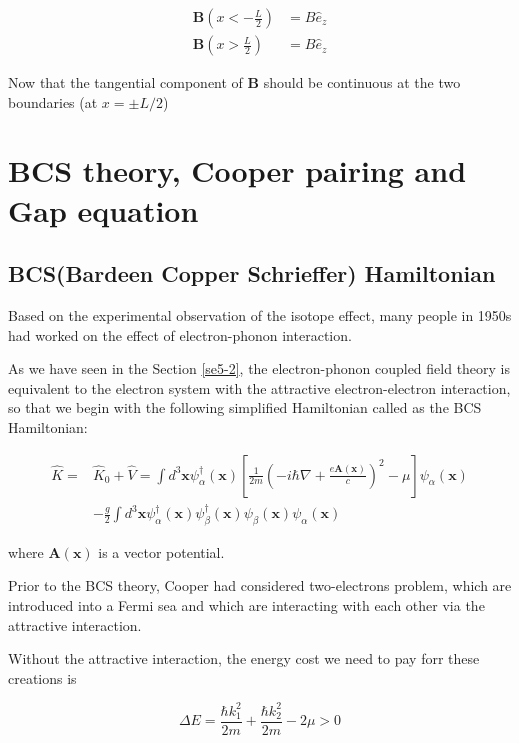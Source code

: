 ﻿\documentclass[twoside]{book}
\numberwithin{equation}{section}
\begin{document}
\[\begin{split}
\bm B\left(x < -\frac{L}{2}\right) &= B\hat{e}_z\\
\bm B\left(x > \frac{L}{2}\right) &= B\hat{e}_z
\end{split} \]

Now that the tangential component of $\bm{B}$ should be continuous at the two boundaries (at $x = \pm L/2$)







\section{BCS theory, Cooper pairing and Gap equation}

\subsection{BCS(Bardeen Copper Schrieffer) Hamiltonian}



Based on the experimental observation of the isotope effect, many people in 1950s had worked on the effect of electron-phonon interaction. 

As we have seen in the Section {\ref{se5-2}}, the electron-phonon coupled field theory is equivalent to the electron system with the attractive electron-electron interaction, so that we begin with the following simplified Hamiltonian called as the BCS Hamiltonian: 

\[\begin{split}
\hat{K} =& \hat{K}_0 + \hat{V} = \int d^3 \bm{x} \psi^{\dagger}_{\alpha}(\bm{x})\left[\frac{1}{2m}\left(-i\hbar \nabla + \frac{e\bm{A}(\bm{x})}{c}\right)^2-\mu\right]\psi_{\alpha}(\bm{x})\\
&-\frac{g}{2}\int d^3\bm{x}\psi^{\dagger}_{\alpha}(\bm{x})\psi^{\dagger}_{\beta}(\bm{x})\psi_{\beta}(\bm{x})\psi_{\alpha}(\bm{x})
\end{split} \]

where $\bm{A}(\bm{x})$ is a vector potential. 

Prior to the BCS theory, Cooper had considered two-electrons problem, which are introduced into a Fermi sea and which are interacting with each other via the attractive interaction. 

Without the attractive interaction, the energy cost we need to pay forr these creations is 

\[\Delta E = \frac{\hbar k_1^2}{2m} + \frac{\hbar k_2^2}{2m}-2\mu > 0 \]
\end{document}
